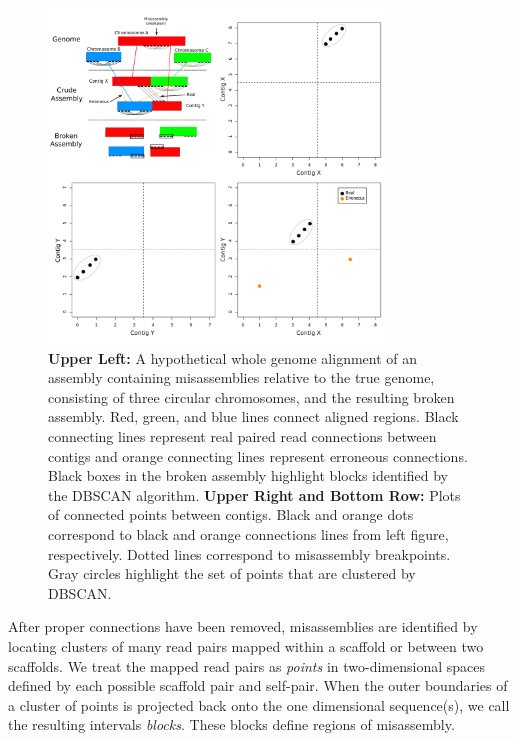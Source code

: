 \documentclass{bioinfo}
\begin{document}
\begin{figure}[t]
\includegraphics[width=3.5in]{a5qc.pdf}
\vspace{-1cm}
\caption{\textbf{Upper Left:}  A hypothetical whole genome alignment of an assembly containing misassemblies relative to the true genome,
consisting of three circular chromosomes, and the 
resulting broken assembly. Red, green, and blue lines connect aligned regions. Black connecting lines represent real paired read 
connections between contigs and orange connecting lines represent erroneous connections. Black boxes in the broken assembly highlight
blocks identified by the DBSCAN algorithm. \textbf{Upper Right and Bottom Row:} Plots of connected points between contigs. Black and orange dots 
correspond to black and orange connections lines from left figure, respectively. Dotted lines correspond
to misassembly breakpoints. Gray circles highlight the set of points that are clustered by DBSCAN. }\label{fig:02}
\end{figure}

After proper connections have been removed, misassemblies are identified by locating clusters of many read pairs mapped within
a scaffold or between two scaffolds. We treat the mapped read pairs as \emph{points} in
two-dimensional spaces defined by each possible scaffold pair and self-pair. When the outer boundaries of a cluster of points
is projected back onto the one dimensional sequence(s), we call the resulting intervals \emph{blocks}.
These blocks define regions of misassembly.
\end{document}
